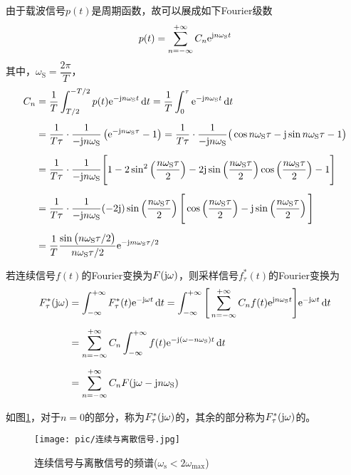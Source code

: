 由于载波信号$p(t)$是周期函数，故可以展成如下Fourier级数
\begin{equation}
	p(t) = \sum_{n = -\infty}^{+\infty }C_n {\rm{e}}^{\text{j} n \omega_\text{S} t}
\end{equation}
其中，$\omega_\text{S}= \dfrac{2\pi}{T}$，
\clearpage
\begin{align}
	C_n &= \dfrac{1}{T}\int_{T/2}^{-T/2}p(t){\rm{e}}^{- \text{j} n \omega_{\text{S}}t}\, {\rm{d}} t = \dfrac{1}{T}\int_{0}^{\tau} {\rm{e}} ^{- \text{j} n \omega_{\text{S}}t}\, {\rm{d}} t \notag \\[0.5em]
	& = \dfrac{1}{T\tau}\cdot \dfrac{1}{- \text{j} n \omega_{\text{S}}} \left({\rm{e}}^{-\text{j} n \omega_{\text{S}} \tau} - 1\right) = \dfrac{1}{T \tau} \cdot \dfrac{1}{-\text{j} n \omega_{\text{S}}} \big(\cos n \omega_{\text{S}} \tau - \text{j} \sin n \omega_{\text{S}} \tau - 1\big)\notag\\[0.5em]
	& = \dfrac{1}{T\tau}\cdot \dfrac{1}{-\text{j} n \omega_{\text{S}}}\Bigg[1 - 2 \sin^2 \left(\dfrac{n \omega_{\text{S}} \tau}{2} \right)- 2 \text{j} \sin \left(\dfrac{n \omega_{\text{S}} \tau}{2} \right) \cos \left(\dfrac{n\omega_{\text{S}}\tau}{2}\right) - 1\Bigg] \notag \\[0.5em]
	& = \dfrac{1}{T \tau} \cdot \dfrac{1}{-\text{j} n \omega_{\text{S}}}(- 2 \text{j}) \sin \left(\dfrac{n \omega_{\text{S}}\tau}{2}\right) \Bigg[\cos\left(\dfrac{n \omega_{\text{S}} \tau}{2}\right)- \text{j} \sin \left(\dfrac{n \omega_{\text{S}} \tau}{2}\right)\Bigg]\notag\\[0.5em]
	& = \dfrac{1}{T} \dfrac{\sin\big(n\omega_{\text{S}}\tau /2 \big)}{n \omega_{\text{S}} \tau / 2} {\rm{e}}^{-\text{j} m \omega_{\text{S}} \tau/2}
\end{align}

若连续信号$f(t)$的Fourier变换为$F(\text{j} \omega)$，则采样信号$f_\tau^*(t)$的Fourier变换为
\begin{align}
	F_\tau^*(\text{j} \omega) &= \int_{-\infty}^{+\infty} F_\tau^*(t){\rm{e}}^{-\text{j} \omega t}\, {\rm{d}} t = \int_{- \infty}^{+\infty} \Bigg[\sum_{n = -\infty}^{+ \infty}C_n f(t){\rm{e}}^{\text{j} n \omega_{\text{S}}t}\Bigg]{\rm{e}}^{-\text{j} \omega t}\, {\rm{d}} t \notag \\[0.5em]
	& = \sum_{n = -\infty}^{+\infty} C_n \int_{-\infty}^{+\infty}f(t){\rm{e}}^{-\text{j} (\omega - n\omega_{\text{S}})t}\, {\rm{d}} t \notag \\[0.5em]
	& = \sum_{n = -\infty}^{+\infty} C_nF(\text{j} \omega - \text{j} n \omega_{\text{S}})
\end{align}

如图\ref{连续与离散信号}，对于$n = 0$的部分，称为$F_\tau^*(\text{j} \omega)$的，其余的部分称为$F_\tau^*(\text{j} \omega)$的。
\vspace*{-1em}
\begin{figure}[!htb]
	\centering
	\texttt{[image: pic/连续与离散信号.jpg]}
	\vspace*{-2em}
	\caption{连续信号与离散信号的频谱($\omega_{\text{s}} < 2 \omega_{\text{max}}$)}
	\label{连续与离散信号}
\end{figure}

